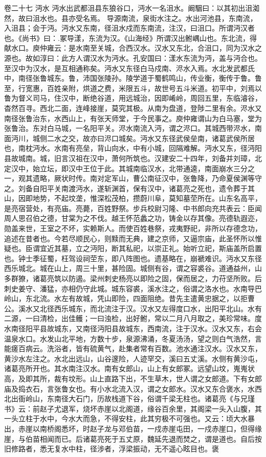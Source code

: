 \documentclass[12pt,UTF8]{ctexbook}
\begin{document}
卷二十七  沔水 
沔水出武都沮县东狼谷口，沔水一名沮水。阚駰曰：以其初出沮洳然，故曰沮水也。县亦受名焉。
导源南流，泉街水注之。水出河池县，东南流，入沮县；会于沔。沔水又东南，径沮水戍而东南流，注汉，曰沮口。所谓沔汉者也。《尚书》曰：.冢导漾，东流为汉。《山海经》所谓汉出鲋嵎山也。东北流，得献水口。庾仲雍云：是水南至关城，合西汉水。汉水又东北，合沮口，同为汉水之源也。故如淳曰：此方人谓汉水为沔水。孔安国曰：漾水东流为沔，盖与沔合也。至汉中为汉水，是互相通称矣。沔水又东径白马戍南、浕水入焉。水北发武都氏中，南径张鲁城东。鲁，沛国张陵孙。陵学道于蜀鹤鸣山，传业衡，衡传于鲁。鲁至，行宽惠，百姓亲附，烘道之费，米限五斗，故世号五斗米道。初平中，刘焉以鲁为督义司马，住汉中，断绝谷道，用远城治，因即崤岭，周回五里，东临濬谷，杳然百寻。西北二面，连峰接崖，莫究其极。从南为盘道，登陟二里有余。浕水又南径张鲁治东，水西山上，有张天师堂，于今民事之。庾仲雍谓山为白马塞，堂为张鲁治。东对白马城，一名阳平关。浕水南流入沔，谓之浕口。其城西带浕水，南面沔川，城侧二水之交，故亦曰浕口城矣。沔水又东径武侯垒南，诸葛武侯所居也，南枕沔水。水南有亮垒，背山向水，中有小城，回隔难解。沔水又东，径沔阳县故城南。城，旧言汉祖在汉中，萧何所筑也。汉建安二十四年，刘备并刘璋，北定汉中，始立坛，即汉中王位于此。其城南临汉水，北带通逵，南面崩水三分之一，观其遗略，厥状时传。南对定军山，曹公南征汉中，张鲁降，乃命夏侯渊等守之。刘备自阳平关南渡沔水，遂斩渊首，保有汉中，诸葛亮之死也，遗令葬于其山，因即地势，不起坟垄，惟深松茂柏，攒蔚川阜，莫知墓茔所在。山东名高平，是亮宿营处，有亮庙。亮薨，百姓野祭。步兵校尉习隆、中书郎向充共表云：臣闻周人思召伯之德，甘棠为之不伐。越王怀范蠡之功，铸金以存其像。亮德轨遐迩，勋盖来世，王室之不坏，实赖斯人。而使百姓巷祭，戎夷野祀，非所以存德念功，追述在昔者也。今若尽顺民心，则黩而无典，建之京师，又逼宗庙，此圣怀所以惟疑也。臣谓宜近其墓，立之沔阳，断其私祀，以崇正礼。始听立祀，斯庙盖所启置也。钟士季征蜀，枉驾设祠茔东，即八阵图也。遗基略在，崩褫难识。沔水又东径西乐城北。城在山上，周三十里，甚险固。城侧有谷，谓之容裘谷。道通益州，山多群獠，诸葛亮筑以防遏。梁州刺史杨亮以即险之固，保而居之，力苻坚所败。后刺史姜守、潘猛，亦相仍守此城。城东容裘，溪水注之，俗谓之洛水也。水南导巴岭山，东北流。水左有故城，凭山即险，四面阻绝。昔先主遣黄忠据之，以拒曹公。溪水又北径西乐城东，而北流注于汉。汉水又左得度口水，出阳平北山。水有二源，一曰清检，出佳鳠；一曰浊检，出好鲋，常以二月八月取之，美珍常味。度水南径阳平县故城东，又南径沔阳县故城东，西南流，注于汉水。汉水又东，右会温泉水口。水发山北平地，方数十步，泉源沸涌，冬夏汤汤，望之则白气浩然，言能瘥百病云。洗浴者，皆有硫黄气，赴集者常有百数。池水通注汉水。汉水又东，黄沙水左注之。水北出远山，山谷邃险，人迹罕交，溪曰五丈溪。水侧有黄沙屯，诸葛亮所开也。其水南注汉水。南有女郎山，山上有女郎冢。远望山坟，嵬嵬状高，及即其所，裁有坟形。山上直路下出，不生草木，世人谓之女郎道。下有女郎庙及捣衣石，言张鲁女也。有小水北流入汉，谓之女郎水。汉水又东合褒水，水西北出衙岭山，东南径大石门，历故栈道下谷，俗谓千梁无柱也。诸葛亮《与兄瑾书》云：前赵子尤退军，烧坏赤崖以北阁道，缘谷百余里，其阁梁一头入山腹，其一头立柱于水中，今水大而急，不得安柱，此其穷极不可强也。又云：顷大水暴出，赤崖以南桥阁悉坏，时赵子龙与邓伯苗，一戍赤崖屯田，一戍赤崖口，但得缘崖，与伯苗相闻而已。后诸葛亮死于五丈原，魏延先退而焚之，谓是道也。自后按旧修路者，悉无复水中柱，径涉者，浮梁振动，无不遥心眩目也。褒
\end{document}
